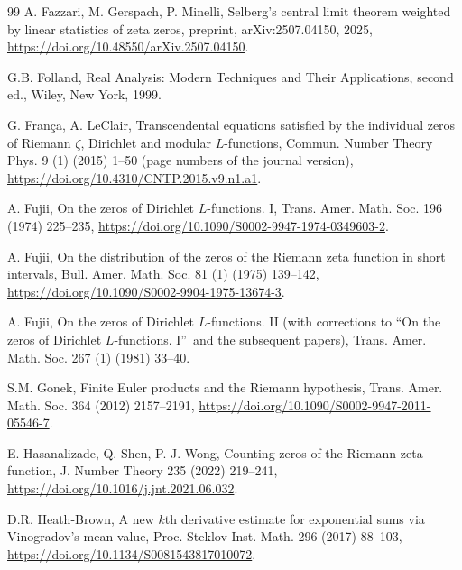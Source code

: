 \documentclass[preprint,12pt]{elsarticle}
\numberwithin{equation}{section}
\theoremstyle{plain}
\theoremstyle{definition}
\theoremstyle{remark}
\begin{document}
\begin{thebibliography}{99}
A. Fazzari, M. Gerspach, P. Minelli, Selberg's central limit theorem weighted by linear statistics of zeta zeros, preprint, arXiv:2507.04150, 2025, \href{https://doi.org/10.48550/arXiv.2507.04150}{https://doi.org/10.48550/arXiv.2507.04150}.

G.B. Folland, Real Analysis: Modern Techniques and Their Applications, second ed., Wiley, New York, 1999.




G. Fran\c{c}a, A. LeClair, Transcendental equations satisfied by the individual zeros of Riemann $\zeta$, Dirichlet and modular $L$-functions, Commun. Number Theory Phys. 9 (1) (2015) 1--50 (page numbers of the journal version), \href{https://doi.org/10.4310/CNTP.2015.v9.n1.a1}{https://doi.org/10.4310/CNTP.2015.v9.n1.a1}.

A. Fujii, On the zeros of Dirichlet $L$-functions. I, Trans. Amer. Math. Soc. 196 (1974) 225--235, \href{https://doi.org/10.1090/S0002-9947-1974-0349603-2}{https://doi.org/10.1090/S0002-9947-1974-0349603-2}.

A. Fujii, On the distribution of the zeros of the Riemann zeta function in short intervals, Bull. Amer. Math. Soc. 81 (1) (1975) 139--142, \href{https://doi.org/10.1090/S0002-9904-1975-13674-3}{https://doi.org/10.1090/S0002-9904-1975-13674-3}.

A. Fujii, On the zeros of Dirichlet $L$-functions. II (with corrections to ``On the zeros of Dirichlet $L$-functions. I\textquotedblright\ and the subsequent papers), Trans. Amer. Math. Soc. 267 (1) (1981) 33--40.

S.M. Gonek, Finite Euler products and the Riemann hypothesis, Trans. Amer. Math. Soc. 364 (2012) 2157--2191, \href{https://doi.org/10.1090/S0002-9947-2011-05546-7}{https://doi.org/10.1090/S0002-9947-2011-05546-7}.

E. Hasanalizade, Q. Shen, P.-J. Wong, Counting zeros of the Riemann zeta function, J. Number Theory 235 (2022) 219--241, \href{https://doi.org/10.1016/j.jnt.2021.06.032}{https://doi.org/10.1016/j.jnt.2021.06.032}.

D.R. Heath-Brown, A new $k$th derivative estimate for exponential sums via Vinogradov's mean value, Proc. Steklov Inst. Math. 296 (2017) 88--103, \href{https://doi.org/10.1134/S0081543817010072}{https://doi.org/10.1134/S0081543817010072}.


\end{thebibliography}
\end{document}
